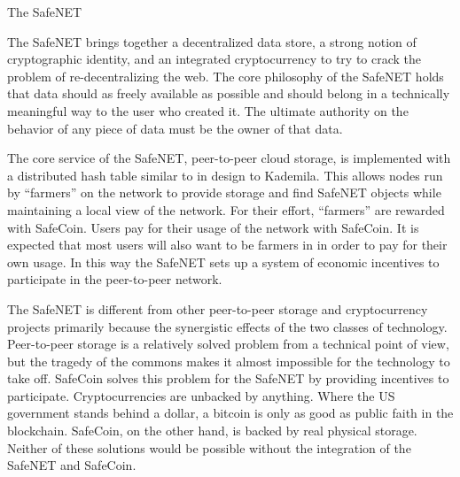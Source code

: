 \documentclass[final]{beamer}
\newlength{\onecolwid}
\begin{document}
\begin{frame}[t]
\begin{columns}[t]
\begin{column}{\onecolwid}
\begin{block}{The SafeNET}

  The SafeNET brings together a decentralized data store, a strong notion of
  cryptographic identity, and an integrated cryptocurrency to try to crack
  the problem of re-decentralizing the web. The core philosophy of the SafeNET
  holds that data should as freely available as possible and should belong in a
  technically meaningful way to the user who created it. The ultimate authority
  on the behavior of any piece of data must be the owner of that data.

  \par

  The core service of the SafeNET, peer-to-peer cloud storage, is implemented
  with a distributed hash table similar to in design to Kademila.\cite{kademila}
  This allows nodes run by ``farmers'' on the network to provide storage and find
  SafeNET objects while maintaining a local view of the network. For their effort,
  ``farmers'' are rewarded with SafeCoin. Users pay for their usage of the network
  with SafeCoin. It is expected that most users will also want to be farmers in
  in order to pay for their own usage. In this way the SafeNET sets up a system of
  economic incentives to participate in the peer-to-peer network.

  \par

  The SafeNET is different from other peer-to-peer storage and cryptocurrency projects
  primarily because the synergistic effects of the two classes of technology.
  Peer-to-peer storage is a relatively solved problem from a technical point of view,
  but the tragedy of the commons makes it almost impossible for the technology to
  take off. SafeCoin solves this problem for the SafeNET by providing incentives to
  participate. Cryptocurrencies are unbacked by anything. Where the US government
  stands behind a dollar, a bitcoin is only as good as public faith in the blockchain.
  SafeCoin, on the other hand, is backed by real physical storage. Neither of these
  solutions would be possible without the integration of the SafeNET and SafeCoin.


\end{block}





\end{column}
\end{columns}
\end{frame}
\end{document}
